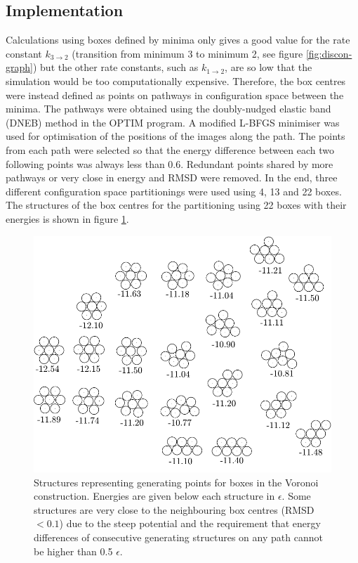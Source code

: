 \subsection{Implementation}
\label{sec:ljimple}

Calculations using boxes defined by minima only gives a good value for the rate constant $k_{3 \rightarrow 2}$ (transition from minimum 3 to minimum 2, see figure \ref{fig:discon-graph}) but the other rate constants, such as $k_{1 \rightarrow 2}$, are so low that the simulation would be too computationally expensive.
Therefore, the box centres were instead defined as points on pathways in configuration space between the minima.
The pathways were obtained using the doubly-nudged elastic band (DNEB) method \cite{Trygubenko2004} in the \mbox{OPTIM\cite{OPTIM}} program.
A modified L-BFGS minimiser\cite{Nocedal1980} was used for optimisation of the positions of the images along the path.
The points from each path were selected so that the energy difference between each two following points was always less than 0.6.
Redundant points shared by more pathways or very close in energy and RMSD were removed.
In the end, three different configuration space partitionings were used using 4, 13 and 22 boxes.
The structures of the box centres for the partitioning using 22 boxes with their energies is shown in figure \ref{fig:boxes}.

\begin{figure}[h]
\centering
\includegraphics[width=12cm]{Images/boxes.pdf}
\caption[Partitioning of configuration space of ${\rm LJ_7^{2D}}$ into boxes.]{Structures representing generating points for boxes in the Voronoi construction. Energies are given below each structure in $\epsilon$. Some structures are very close to the neighbouring box centres (RMSD$< 0.1$) due to the steep potential and the requirement that energy differences of consecutive generating structures on any path cannot be higher than 0.5 $\epsilon$.}
\label{fig:boxes}
\end{figure}

